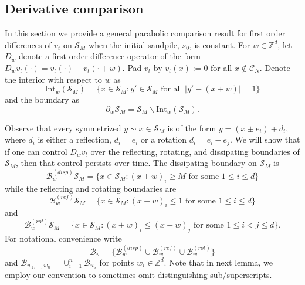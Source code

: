 \documentclass[12pt]{amsart}
\newcommand{\Z}{\mathbb{Z}}
\begin{document}
	
	\subsection{Derivative comparison} \label{subsec:derivative_comparison}
	In this section we provide a general parabolic comparison result for first order differences of $v_t$ on $\mathcal{S}_M$
	when the initial sandpile, $s_0$, is constant. For $w \in \Z^d$, let $D_{w}$ denote a first order difference operator of the form $D_{w} v_t(\cdot) = v_t(\cdot) - v_t(\cdot+w)$. Pad $v_t$ by $v_t(x) := 0$ for all $x \not \in \mathcal{C}_N$.  
	Denote the interior with respect to $w$ as 
	\begin{equation}
	\mbox{Int}_w(\mathcal{S}_M) = \{ x \in \mathcal{S}_M : y' \in \mathcal{S}_M \mbox{ for all $|y'-(x+w)| = 1$} \}
	\end{equation}
	and the boundary as 
	\begin{equation}
	\partial_w \mathcal{S}_M = \mathcal{S}_M \backslash \mbox{Int}_w(\mathcal{S}_M).  
	\end{equation}

	
	Observe that every symmetrized $y \sim x \in \mathcal{S}_M$ is of the form $y = (x \pm e_i) \mp d_i$,  where $d_i$ is either a reflection, $d_i = e_i$ or a 
	rotation $d_i = e_i -e_j$. We will show that if one can control $D_{w} v_t$ over the reflecting, rotating, and dissipating boundaries of $\mathcal{S}_M$, then that control persists over time. The dissipating boundary on $\mathcal{S}_M$ is
	\begin{equation} \label{eq:dissipative_boundary}
	\mathcal{B}^{(disp)}_w \mathcal{S}_M = \{ x \in \mathcal{S}_M : (x + w)_{i} \geq M  \mbox{ for some $1 \leq i \leq d$} \}
	\end{equation}
	while the reflecting and rotating boundaries are  
	\begin{equation} \label{eq:reflecting_boundary}
	\mathcal{B}^{(ref)}_w \mathcal{S}_M = \{ x \in \mathcal{S}_M : (x+w)_{i} \leq 1 \mbox{ for some $1 \leq i \leq d$} \}
	\end{equation}
	and
	\begin{equation} \label{eq:rotating_boundary}
	\mathcal{B}^{(rot)}_w \mathcal{S}_M = \{ x \in \mathcal{S}_M : (x+w)_i \leq (x + w)_j \mbox{ for some $1 \leq i < j \leq d$} \}.
	\end{equation}
	For notational convenience write
	\begin{equation} \label{eq:all_boundaries}
	\mathcal{B}_w = \{\mathcal{B}^{(disp)}_{w}  \cup \mathcal{B}^{(ref)}_{w} \cup \mathcal{B}^{(rot)}_{w} \}
	\end{equation}
	and  $\mathcal{B}_{w_1, \ldots, w_n} = \cup_{i=1}^n \mathcal{B}_{w_i}$
	for points $w_i \in \Z^d$. 
		Note that in next lemma, we employ our convention to sometimes omit distinguishing sub/superscripts. 
	
\end{document}
